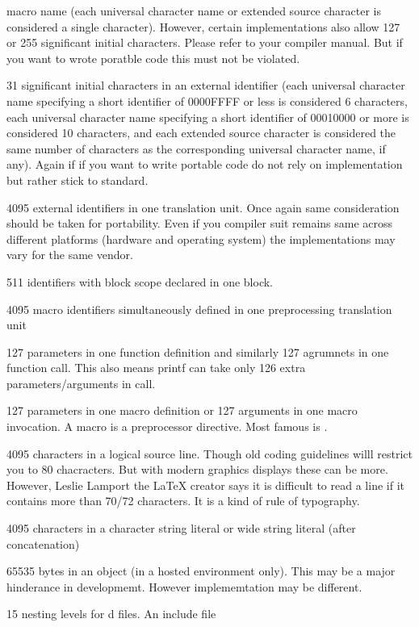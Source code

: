   macro name (each universal character name or extended source
  character is considered a single character). However, certain
  implementations also allow 127 or 255 significant initial
  characters. Please refer to your compiler manual. But if you want to
  wrote poratble code this must not be violated.
\item 31 significant initial characters in an external identifier
  (each universal character name specifying a short identifier of
  0000FFFF or less is considered 6 characters, each universal
  character name specifying a short identifier of 00010000 or more is
  considered 10 characters, and each extended source character is
  considered the same number of characters as the corresponding
  universal character name, if any). Again if if you want to write
  portable code do not rely on implementation but rather stick to
  standard.
\item 4095 external identifiers in one translation unit. Once again
  same consideration should be taken for portability. Even if you
  compiler suit remains same across different platforms (hardware and
  operating system) the implementations may vary for the same vendor.
\item 511 identifiers with block scope declared in one block.
\item 4095 macro identifiers simultaneously defined in one
  preprocessing translation unit
\item 127 parameters in one function definition and similarly 127
  agrumnets in one function call. This also means printf can take only
  126 extra parameters/arguments in call.
\item 127 parameters in one macro definition or 127 arguments in one
  macro invocation. A macro is a preprocessor directive. Most famous
  is .
\item 4095 characters in a logical source line. Though old coding
  guidelines willl restrict you to 80 chacracters. But with modern
  graphics displays these can be more. However, Leslie Lamport the
  \LaTeX{} creator says it is difficult to read a line if it contains
  more than 70/72 characters. It is a kind of rule of typography.
\item 4095 characters in a character string literal or wide string
  literal (after concatenation)
\item 65535 bytes in an object (in a hosted environment only). This
  may be a major hinderance in developmemt. However implememtation may
  be different.
\item 15 nesting levels for d files. An include file
